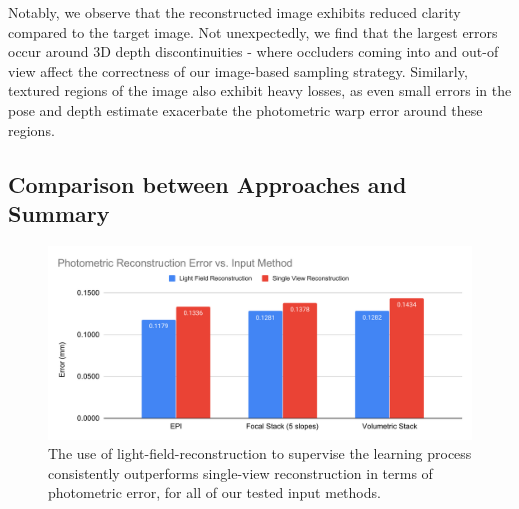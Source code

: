 Notably, we observe that the reconstructed image exhibits reduced clarity compared to the target image. Not unexpectedly, we find that the largest errors occur around 3D depth discontinuities - where occluders coming into and out-of view affect the correctness of our image-based sampling strategy. Similarly, textured regions of the image also exhibit heavy losses, as even small errors in the pose and depth estimate exacerbate the photometric warp error around these regions.

\subsection{Comparison between Approaches and Summary}

\begin{figure}
\includegraphics[width=\textwidth]{images/result-examples/bargraphs/photometric-error-vs-inputmethod.pdf}
\caption{The use of light-field-reconstruction to supervise the learning process consistently outperforms single-view reconstruction in terms of photometric error, for all of our tested input methods.}
\end{figure}


























